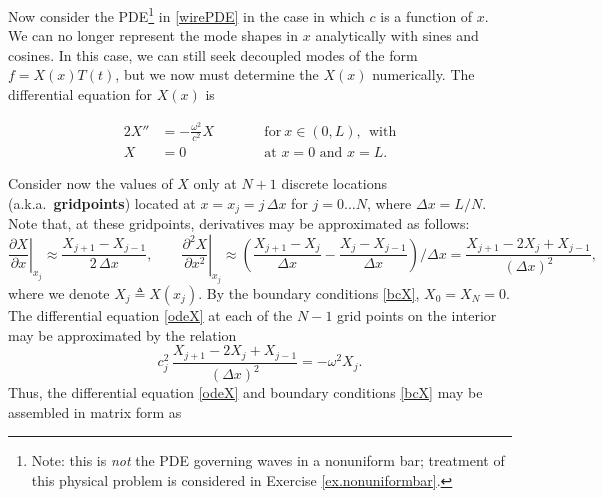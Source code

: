 Now consider the PDE\footnote{Note: this is {\it not} the PDE governing waves in a nonuniform bar;
treatment of this physical problem is considered in Exercise \ref{ex.nonuniformbar}.}
in \eqref{wirePDE} in the case in which $c$ is a function of $x$.  We can
no longer represent the mode shapes in $x$ analytically with sines and
cosines.  In this case, we can still seek decoupled modes of the form
$f = X(x) T(t)$, but we now must determine the $X(x)$ numerically.
The differential equation for $X(x)$ is
\begin{subeqnA}
\begin{alignat}{2}
X'' &= -\frac{\omega^2}{c^2} X  \qquad &&\textrm{for}\ x\in(0,L), \ \ \textrm{with} \label{odeX} \\
X&=0 && \textrm{at\ } x=0 \textrm{\ \ and\ \ } x=L. \label{bcX} 
\end{alignat}
\end{subeqnA}
Consider now the values of $X$ only at $N+1$ discrete locations (a.k.a.~{\bf gridpoints}) located at $x=x_{j}=j\,\Delta x$ for $j=0\ldots N$, where $\Delta
x=L/N$.  Note that, at these gridpoints, derivatives may be approximated as follows:
\begin{equation*}
\left. \frac{\partial X}{\partial x}\right|_{x_j} \approx
\frac{ X_{j+1} -  X_{j-1}}{2\,\Delta x}, \qquad
\left. \frac{\partial^2 X}{\partial x^2}\right|_{x_j} \approx
\left( \frac{ X_{j+1} - X_{j}}{\Delta x} - \frac{ X_{j} - X_{j-1}}{\Delta x} \right) / \Delta x =
\frac{ X_{j+1} - 2 X_{j} + X_{j-1}}{(\Delta x)^2},
\end{equation*}
where we denote $X_j\triangleq X(x_j)$.  By the boundary conditions \eqref{bcX}, $X_0=X_N=0$.  The
differential equation \eqref{odeX} at each of the $N-1$ grid points on the interior
may be approximated by the relation
\begin{equation*}
c^2_j \,\frac{ X_{j+1} - 2 X_{j} + X_{j-1}}{(\Delta x)^2} = - \omega^2 X_{j}.
\end{equation*}
Thus, the differential equation \eqref{odeX} and boundary conditions \eqref{bcX}
may be assembled in matrix form as
